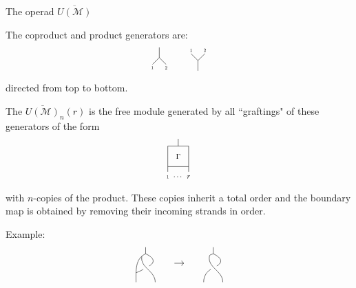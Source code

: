 \documentclass[10pt,t, handout]{beamer} %
\newcommand{\M}{\overline{U(\mathcal M)}}
\begin{document}
\begin{frame}{The operad $\M$}
	
	The coproduct and product generators are: \vspace*{-5pt}
	\begin{equation*}
	\begin{tikzpicture}[scale=.5]
	\draw (0,0)--(0,.75);
	\draw (0,0)--(.5,-.5);
	\draw (0,0)--(-.5,-.5);
	\node[scale=.5] at (-.5,-.75){1};
	\node[scale=.5] at (.5,-.75){2};
	\end{tikzpicture}
	\qquad
	\begin{tikzpicture}[scale=.5]
	\draw (0,0)--(0,-.75);
	\draw (0,0)--(.5,.5);
	\draw (0,0)--(-.5,.5);
	\node[scale=.5] at (-.5,.75){1};
	\node[scale=.5] at (.5,.75){2};
	\end{tikzpicture}
	\vspace*{-10pt}
	\end{equation*}
	directed from top to bottom.
	
	\pause \vspace*{10pt}
	
	The $\M_n(r)$ is the free module generated by all ``graftings" of these generators of the form \vspace*{-15pt}
	\begin{equation*}
	\begin{tikzpicture}[scale=.75]
	\draw (-.5,1)--(.5,1)--(.5,0)--(-.5,0)--(-.5,1);
	\node[scale=.75] at (0,.5){$\Gamma$};
	\draw (0,1)--(0,1.35);
	\draw (-.5,0)--(-.5,-.25);
	\node[scale=.5] at (-.5,-.5){1};
	\draw (.5,0)--(.5,-.25);
	\node[scale=.75] at (.5,-.5){$r$};
	\node[scale=.75] at (0,-.5){$\cdots$};
	\end{tikzpicture}
	\vspace*{-10pt}
	\end{equation*}
	with $n$-copies of the product. \pause These copies inherit a total order and the boundary map is obtained by removing their incoming strands in order. \vspace*{5pt}
	
	\textcolor{pblue}{Example:}
	\begin{equation*}
	\begin{tikzpicture}[scale=.35]
	\draw (1,3.7) to (1,3); 
	\draw (1,3) to [out=205, in=90] (0,0);
	\draw [shorten >= 0cm] (.6,2.73) to [out=-100, in=90] (2,0);
	\draw [shorten >= .15cm] (1,3) to [out=-25, in=30, distance=1.1cm] (1,1.5);
	\draw [shorten <= .1cm] (1,1.5) to [out=210, in=20] (0,1);
	
	\draw[->] (4,2) to (5,2);
	\end{tikzpicture}
	\qquad %
	\begin{tikzpicture}[scale=.35]
	\draw (1,3.7) to (1,3); 
	\draw (1,3) to [out=205, in=90] (.6,2.73);
	\draw [shorten >= 0cm] (.6,2.73) to [out=-100, in=90] (2,0);
	\draw [shorten >= .15cm] (1,3) to [out=-25, in=30, distance=1.1cm] (1,1.5);
	\draw [shorten <= .1cm] (1,1.5) to [out=210, in=90] (0,0);
	

\end{tikzpicture}
\end{equation*}
\end{frame}
\end{document}
